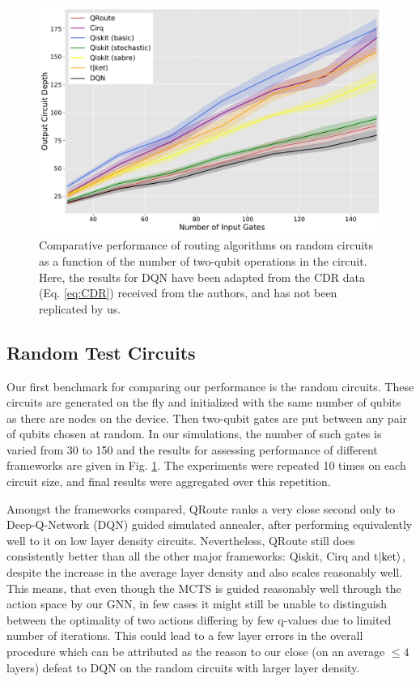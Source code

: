 \documentclass[%
 reprint,
 longbibliography,
 amsmath,amssymb,
 aps,
]{revtex4-2}
\begin{document}
\begin{figure}[t]
    \includegraphics[width=\linewidth]{images/random_benchmark.pdf}
    \caption{\label{fig:results-random}
        Comparative performance of routing algorithms on random circuits as a function of the number of two-qubit operations in the circuit. Here, the results for DQN have been adapted from the CDR data (Eq. \ref{eq:CDR}) received from the authors, and has not been replicated by us.}
\end{figure}


\subsection{\label{sec:results-random}Random Test Circuits}

Our first benchmark for comparing our performance is the random circuits. These circuits are generated on the fly and initialized with the same number of qubits as there are nodes on the device. Then two-qubit gates are put between any pair of qubits chosen at random. In our simulations, the number of such gates is varied from 30 to 150 and the results for assessing performance of different frameworks are given in Fig. \ref{fig:results-random}. The experiments were repeated 10 times on each circuit size, and final results were aggregated over this repetition. 

Amongst the frameworks compared, QRoute ranks a very close second only to Deep-Q-Network (DQN) guided simulated annealer, after performing equivalently well to it on low layer density circuits. Nevertheless, QRoute still does consistently better than all the other major frameworks: Qiskit, Cirq and t$\ket{\text{ket}}$, despite the increase in the average layer density and also scales reasonably well. This means, that even though the MCTS is guided reasonably well through the action space by our GNN, in few cases it might still be unable to distinguish between the optimality of two actions differing by few q-values due to limited number of iterations. This could lead to a few layer errors in the overall procedure which can be attributed as the reason to our close (on an average $\leq4$ layers) defeat to DQN on the random circuits with larger layer density.
\end{document}
